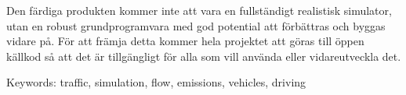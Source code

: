     Den färdiga produkten kommer inte att vara en fullständigt realistisk simulator, utan en robust grundprogramvara med god potential att förbättras och byggas vidare på. För att främja detta kommer hela projektet att göras till öppen källkod så att det är tillgängligt för alla som vill använda eller vidareutveckla det.

\vfill
Keywords: traffic, simulation, flow, emissions, vehicles, driving

\newpage
\thispagestyle{empty}
\mbox{}